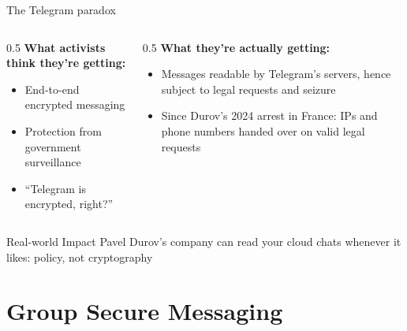 \ifdefined\PRESENTATION\else\PassOptionsToClass{handout}{beamer}\fi\documentclass[aspectratio=169, lualatex]{beamer}
\begin{document}
\begin{frame}{The Telegram paradox}
	\begin{columns}[c]
		\begin{column}{0.5\textwidth}
			\textbf{What activists think they're getting:}
			\begin{itemize}
				\item End-to-end encrypted messaging
				\item Protection from government surveillance
				\item ``Telegram is encrypted, right?''
			\end{itemize}
		\end{column}
		\begin{column}{0.5\textwidth}
			\textbf{What they're actually getting:}
			\begin{itemize}
				\item Messages readable by Telegram's servers, hence subject to legal requests and seizure
				\item Since Durov's 2024 arrest in France: IPs and phone numbers handed over on valid legal requests
			\end{itemize}
		\end{column}
	\end{columns}
	\begin{alertblock}{Real-world Impact}
		Pavel Durov's company can read your cloud chats whenever it likes: policy, not cryptography
	\end{alertblock}
\end{frame}

\section{Group Secure Messaging}
\end{document}

